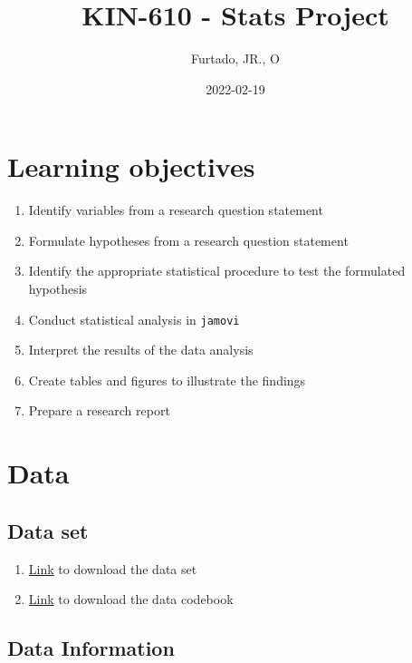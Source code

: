 \documentclass[
]{article}
\title{KIN-610 - Stats Project}
\author{Furtado, JR., O}
\date{2022-02-19}
\providecommand{\tightlist}{%
  \setlength{\itemsep}{0pt}\setlength{\parskip}{0pt}}
\begin{document}
\maketitle

{
\setcounter{tocdepth}{2}
\tableofcontents
}
\hypertarget{learning-objectives}{%
\section{Learning objectives}\label{learning-objectives}}

\begin{enumerate}
\def\labelenumi{\arabic{enumi}.}
\tightlist
\item
  Identify variables from a research question statement
\item
  Formulate hypotheses from a research question statement
\item
  Identify the appropriate statistical procedure to test the formulated hypothesis
\item
  Conduct statistical analysis in \texttt{jamovi}
\item
  Interpret the results of the data analysis
\item
  Create tables and figures to illustrate the findings
\item
  Prepare a research report
\end{enumerate}

\hypertarget{data}{%
\section{Data}\label{data}}

\hypertarget{data-set}{%
\subsection{Data set}\label{data-set}}

\begin{enumerate}
\def\labelenumi{\arabic{enumi}.}
\tightlist
\item
  \href{https://osf.io/bf58v/}{Link} to download the data set
\item
  \href{https://osf.io/sg46v/}{Link} to download the data codebook
\end{enumerate}

\hypertarget{data-info}{%
\subsection{Data Information}\label{data-info}}
\end{document}
